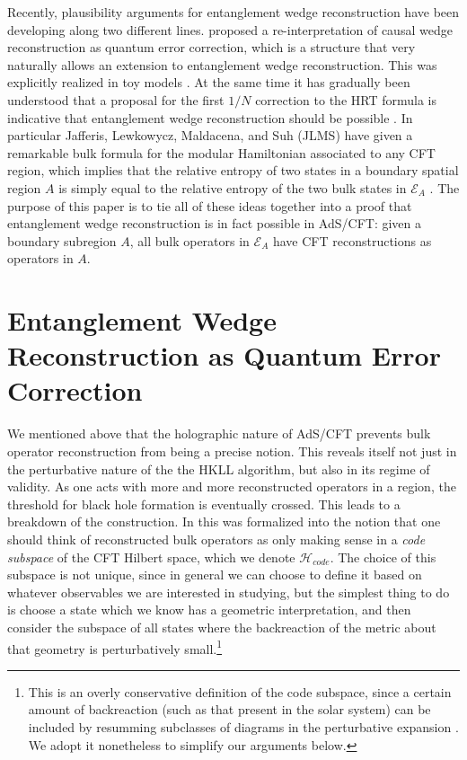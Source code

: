 \documentclass[aps,nofootinbib,longbibliography,superscriptaddress,12pt]{revtex4-1}
\newcommand{\EA}{\mathcal{E}_A}
\newcommand{\Hc}{\mathcal{H}_{code}}
\begin{document}
Recently, plausibility arguments for entanglement wedge reconstruction have been developing along two different lines. \cite{Almheiri:2014lwa} proposed a re-interpretation of causal wedge reconstruction as quantum error correction, which is a structure that very naturally allows an extension to entanglement wedge reconstruction.  This was explicitly realized in toy models \cite{Pastawski:2015qua,Hayden:2016cfa}.  At the same time it has gradually been understood that a proposal \cite{Faulkner:2013ana} for the first $1/N$ correction to the HRT formula is indicative that entanglement wedge reconstruction should be possible \cite{Almheiri:2014lwa,Jafferis:2014lza,Jafferis:2015del}.  In particular Jafferis, Lewkowycz, Maldacena, and Suh (JLMS) have given a remarkable bulk formula for the modular Hamiltonian associated to any CFT region, which implies that the relative entropy of two states in a boundary spatial region $A$ is simply equal to the relative entropy of the two bulk states in $\EA$ \cite{Jafferis:2015del}.  The purpose of this paper is to tie all of these ideas together into a proof that entanglement wedge reconstruction is in fact possible in AdS/CFT: given a boundary subregion $A$, all bulk operators in $\EA$ have CFT reconstructions as operators in $A$.

\section{Entanglement Wedge Reconstruction as Quantum Error Correction}
We mentioned above that the holographic nature of AdS/CFT prevents bulk operator reconstruction from being a precise notion.  This reveals itself not just in the perturbative nature of the the HKLL algorithm, but also in its regime of validity.  As one acts with more and more reconstructed operators in a region, the threshold for black hole formation is eventually crossed.  This leads to a breakdown of the construction.  In \cite{Almheiri:2014lwa} this was formalized into the notion that one should think of reconstructed bulk operators as only making sense in a \textit{code subspace} of the CFT Hilbert space, which we denote $\Hc$.  The choice of this subspace is not unique, since in general we can choose to define it based on whatever observables we are interested in studying, but the simplest thing to do is choose a state which we know has a geometric interpretation, and then consider the subspace of all states where the backreaction of the metric about that geometry is perturbatively small.\footnote{This is an overly conservative definition of the code subspace, since a certain amount of backreaction (such as that present in the solar system) can be included by resumming subclasses of diagrams in the perturbative expansion \cite{Heemskerk:2012mn,Marolf:2015dia}.  We adopt it nonetheless to simplify our arguments below.}
\end{document}
